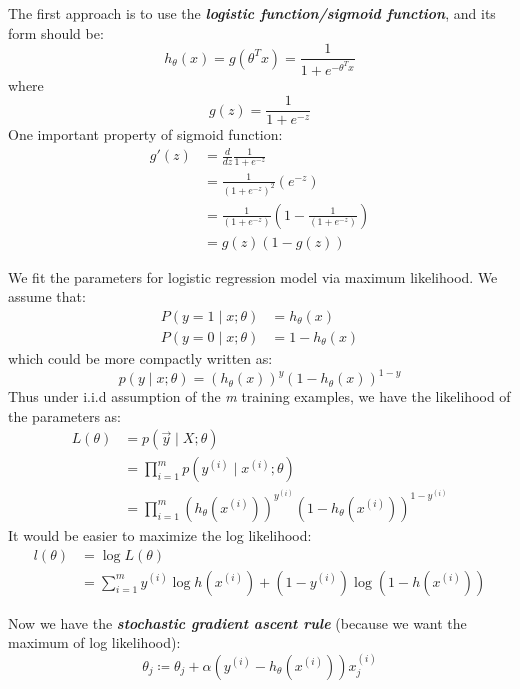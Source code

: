 \documentclass{article}
\begin{document}
The first approach is to use the \emph{\textbf{logistic function/sigmoid function}}, and its form should be:
\begin{equation*}
h_\theta(x)=g(\theta^Tx)=\frac{1}{1+e^{-\theta^Tx}}
\end{equation*}
where
\begin{equation*}
g(z)=\frac{1}{1+e^{-z}}
\end{equation*}
One important property of sigmoid function:
\begin{align*}
g'(z) &= \frac{d}{dz}\frac{1}{1+e^{-z}} \\
      &= \frac{1}{{(1+e^{-z})}^2}(e^{-z}) \\
      &= \frac{1}{(1+e^{-z})}\left(1-\frac{1}{(1+e^{-z})}\right) \\
      &= g(z)(1-g(z))
\end{align*}

We fit the parameters for logistic regression model via maximum likelihood.
We assume that:
\begin{align*}
P(y=1\mid x;\theta) &= h_\theta(x) \\
P(y=0\mid x;\theta) &= 1 - h_\theta(x)
\end{align*}
which could be more compactly written as:
\begin{equation*}
p(y\mid x;\theta) = (h_\theta(x))^y(1-h_\theta(x))^{1-y}
\end{equation*}
Thus under i.i.d assumption of the \emph{m} training examples, we have the likelihood of the parameters as:
\begin{align*}
L(\theta) &= p(\vec{y}\mid X;\theta) \\
          &= \prod\limits_{i=1}^mp(y^{(i)}\mid x^{(i)};\theta) \\
          &= \prod\limits_{i=1}^m\left(h_\theta(x^{(i)})\right)^{y^{(i)}}\left(1-h_\theta(x^{(i)})\right)^{1-y^{(i)}}
\end{align*}
It would be easier to maximize the log likelihood:
\begin{align*}
l(\theta) &= \log L(\theta) \\
          &= \sum\limits_{i=1}^my^{(i)}\log h(x^{(i)}) + (1-y^{(i)}) \log(1-h(x^{(i)}))
\end{align*}

Now we have the \emph{\textbf{stochastic gradient ascent rule}} (because we want the maximum of log likelihood):
\begin{equation*}
\theta_j\coloneqq\theta_j + \alpha(y^{(i)}-h_\theta(x^{(i)}))x_j^{(i)}
\end{equation*}
\end{document}
